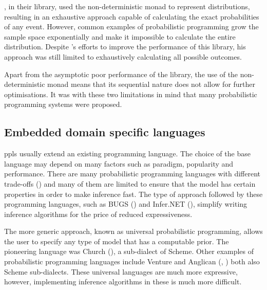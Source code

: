 \documentclass[
  oneside,
  11pt, a4paper,
  footinclude=true,
  headinclude=true,
  cleardoublepage=empty
]{scrbook}
\theoremstyle{definition}
\theoremstyle{definition}
\begin{document}
         \cite {erwig_kollmansberger_2006}, in their library, used the non-deterministic monad to represent distributions, resulting in an exhaustive approach capable of calculating the exact probabilities of any event. However, common examples of probabilistic programming grow the sample space exponentially and make it impossible to calculate the entire distribution. Despite \cite{larsen2011memory} 's efforts to improve the performance of this library, his approach was still limited to exhaustively calculating all possible outcomes.
                
         Apart from the asymptotic poor performance of the \cite{erwig_kollmansberger_2006} library, the use of the non-deterministic monad means that its sequential nature does not allow for further optimisations. It was with these two limitations in mind that many probabilistic programming systems were proposed.
        
        \subsection{Embedded domain specific languages}
        
        \glspl{ppl} usually extend an existing programming language. The choice of the base language may depend on many factors such as paradigm, popularity and performance. There are many probabilistic programming languages ​​with different trade-offs (\cite{Scibior:2015:PPP:2887747.2804317}) and many of them are limited to ensure that the model has certain properties in order to make inference fast. The type of approach followed by these programming languages, such as BUGS (\cite{gilks1994language}) and Infer.NET (\cite{minkainfer}), simplify writing inference algorithms for the price of reduced expressiveness.
        
        The more generic approach, known as universal probabilistic programming, allows the user to specify any type of model that has a computable prior. The pioneering language was Church (\cite{goodman2012church}), a sub-dialect of Scheme. Other examples of probabilistic programming languages include Venture and Anglican (\cite{mansinghka2014venture}, \cite{tolpin2015probabilistic}) both also Scheme sub-dialects. These universal languages are much more expressive, however, implementing inference algorithms in these is much more difficult.
                
\end{document}
